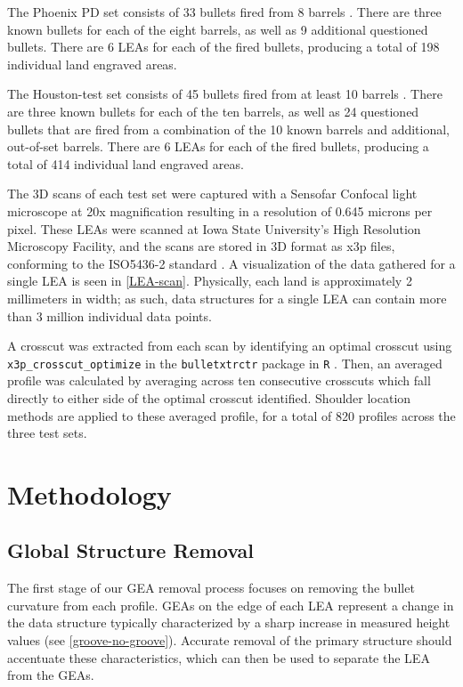 \documentclass[12pt]{article}
\begin{document}
The Phoenix PD set consists of 33 bullets fired from 8 barrels
. There are three known
bullets for each of the eight barrels, as well as 9 additional
questioned bullets. There are 6 LEAs for each of the fired bullets,
producing a total of 198 individual land engraved areas.

The Houston-test set consists of 45 bullets fired from at least 10
barrels . There are three
known bullets for each of the ten barrels, as well as 24 questioned
bullets that are fired from a combination of the 10 known barrels and
additional, out-of-set barrels. There are 6 LEAs for each of the fired
bullets, producing a total of 414 individual land engraved areas.

The 3D scans of each test set were captured with a Sensofar Confocal
light microscope at 20x magnification resulting in a resolution of 0.645
microns per pixel. These LEAs were scanned at Iowa State University's
High Resolution Microscopy Facility, and the scans are stored in 3D
format as x3p files, conforming to the ISO5436-2 standard
\citep{ISO5436}. A visualization of the data gathered for a single LEA
is seen in \autoref{LEA-scan}. Physically, each land is approximately 2
millimeters in width; as such, data structures for a single LEA can
contain more than 3 million individual data points.

A crosscut was extracted from each scan by identifying an optimal
crosscut using \texttt{x3p\_crosscut\_optimize} in the
\texttt{bulletxtrctr} package in \texttt{R} \cite{bulletxtrctr}. Then,
an averaged profile was calculated by averaging across ten consecutive
crosscuts which fall directly to either side of the optimal crosscut
identified. Shoulder location methods are applied to these averaged
profile, for a total of 820 profiles across the three test sets.

\section{Methodology}

\subsection{Global Structure Removal}

The first stage of our GEA removal process focuses on removing the
bullet curvature from each profile. GEAs on the edge of each LEA
represent a change in the data structure typically characterized by a
sharp increase in measured height values (see
\autoref{groove-no-groove}). Accurate removal of the primary structure
should accentuate these characteristics, which can then be used to
separate the LEA from the GEAs.
\end{document}
